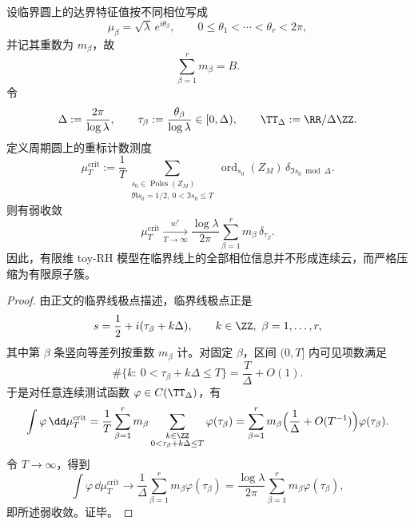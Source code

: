\begin{theorem}[临界线极点在周期圆上的精确极限测度]\label{thm:conclusion-toyrh-critical-line-atomic-limit-measure}
设临界圆上的达界特征值按不同相位写成
\[
\mu_\beta=\sqrt{\lambda}\,e^{i\theta_\beta},
\qquad
0\le \theta_1<\cdots<\theta_r<2\pi,
\]
并记其重数为 \(m_\beta\)，故
\[
\sum_{\beta=1}^r m_\beta=B.
\]
令
\[
\Delta:=\frac{2\pi}{\log\lambda},
\qquad
\tau_\beta:=\frac{\theta_\beta}{\log\lambda}\in [0,\Delta),
\qquad
\TT_\Delta:=\RR/\Delta\ZZ.
\]
定义周期圆上的重标计数测度
\[
\mu_T^{\mathrm{crit}}
:=
\frac1T
\sum_{\substack{s_0\in\operatorname{Poles}(Z_M)\\ \Re s_0=1/2,\ 0<\Im s_0\le T}}
\operatorname{ord}_{s_0}(Z_M)\,
\delta_{\Im s_0 \bmod \Delta}.
\]
则有弱收敛
\[
\mu_T^{\mathrm{crit}}
\xrightarrow[T\to\infty]{w^\ast}
\frac{\log\lambda}{2\pi}
\sum_{\beta=1}^r m_\beta\,\delta_{\tau_\beta}.
\]
因此，有限维 toy-RH 模型在临界线上的全部相位信息并不形成连续云，而严格压缩为有限原子簇。
\end{theorem}
\begin{proof}
由正文的临界线极点描述，临界线极点正是
\[
s=\frac12+i(\tau_\beta+k\Delta),
\qquad
k\in\ZZ,\ \beta=1,\dots,r,
\]
其中第 \(\beta\) 条竖向等差列按重数 \(m_\beta\) 计。对固定 \(\beta\)，区间 \((0,T]\) 内可见项数满足
\[
\#\{k:\ 0<\tau_\beta+k\Delta\le T\}
=
\frac{T}{\Delta}+O(1).
\]
于是对任意连续测试函数 \(\varphi\in C(\TT_\Delta)\)，有
\[
\int \varphi\,\dd\mu_T^{\mathrm{crit}}
=
\frac1T
\sum_{\beta=1}^{r}m_\beta
\sum_{\substack{k\in\ZZ\\ 0<\tau_\beta+k\Delta\le T}}
\varphi(\tau_\beta)
=
\sum_{\beta=1}^r m_\beta
\Bigl(\frac1\Delta+O(T^{-1})\Bigr)\varphi(\tau_\beta).
\]
令 \(T\to\infty\)，得到
\[
\int \varphi\,\dd\mu_T^{\mathrm{crit}}
\to
\frac1\Delta\sum_{\beta=1}^r m_\beta\varphi(\tau_\beta)
=
\frac{\log\lambda}{2\pi}\sum_{\beta=1}^r m_\beta\varphi(\tau_\beta),
\]
即所述弱收敛。证毕。
\end{proof}

